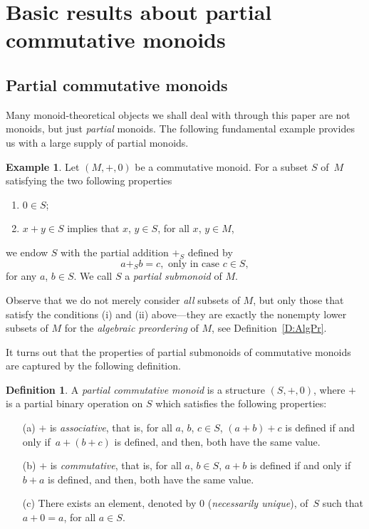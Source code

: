 \documentclass[psamsfonts,reqno]{memo-l}
\theoremstyle{plain}
\theoremstyle{definition}
\newtheorem{definition}[lemma]{Definition}
\newtheorem{example}[lemma]{Example}
\theoremstyle{remark}
\numberwithin{equation}{section}
\renewcommand{\iff}{if and only if}
\newcommand{\cm}{commutative mon\-oid}
\newcommand{\pcm}{partial commutative mon\-oid}
\begin{document}
\section[Basic results]
{Basic results about partial commutative monoids}\label{S:BasicResults}

\subsection{Partial commutative monoids}
Many monoid-theoretical objects we shall deal with through this paper are not
monoids, but just \emph{partial} monoids. The following fundamental example
provides us with a large supply of partial monoids.

\begin{example}\label{Ex:FundPartMon}
Let $(M,+,0)$ be a \cm. For a subset $S$ of~$M$ satisfying the two
following properties
\begin{enumerate}
\item $0\in S$;

\item $x+y\in S$ implies that $x$, $y\in S$, for all $x$, $y\in M$,
\end{enumerate}
we endow $S$ with the partial addition $+_S$ defined by
   \[
   a+_Sb=c,\text{ only in case }c\in S,
   \]
for any $a$, $b\in S$. We call $S$ a \emph{partial submonoid} of $M$.
\end{example}

Observe that we do not merely consider \emph{all} subsets of $M$, but only
those that satisfy the conditions (i) and (ii) above---they are exactly the
nonempty lower subsets of $M$ for the \emph{algebraic preordering} of $M$,
see Definition~\ref{D:AlgPr}.

It turns out that the properties of partial submonoids of \cm s are captured
by the following definition.

\begin{definition}\label{D:PartCM}
A \emph{\pcm}
is a structure $(S,+,0)$, where $+$ is a partial binary
operation on $S$ which satisfies the following properties:
\begin{itemize}

\item[(a)] $+$ is \emph{associative}, that is, for all $a$, $b$, $c\in S$,
$(a+b)+c$ is defined \iff\ $a+(b+c)$ is defined, and then, both have the
same value.

\item[(b)] $+$ is \emph{commutative}, that is, for all $a$, $b\in S$,
$a+b$ is defined \iff\ $b+a$ is defined, and then, both have the same
value.

\item[(c)] There exists an element, denoted by $0$ (\emph{necessarily
unique}), of~$S$ such that $a+0=a$, for all $a\in S$.
\end{itemize}
\end{definition}
\end{document}
